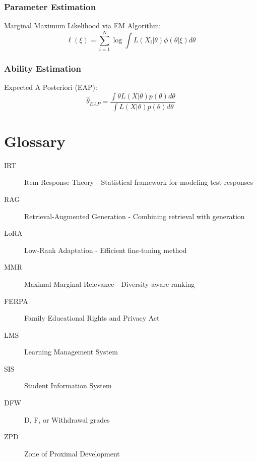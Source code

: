 \documentclass[11pt,a4paper]{report}
\begin{document}
\subsection{Parameter Estimation}
Marginal Maximum Likelihood via EM Algorithm:
\begin{equation}
\ell(\xi) = \sum_{i=1}^N \log \int L(X_i|\theta)\phi(\theta|\xi)d\theta
\end{equation}

\subsection{Ability Estimation}
Expected A Posteriori (EAP):
\begin{equation}
\hat{\theta}_{EAP} = \frac{\int \theta L(X|\theta)p(\theta)d\theta}{\int L(X|\theta)p(\theta)d\theta}
\end{equation}

\chapter{Glossary}

\begin{description}
    \item[IRT] Item Response Theory - Statistical framework for modeling test responses
    \item[RAG] Retrieval-Augmented Generation - Combining retrieval with generation
    \item[LoRA] Low-Rank Adaptation - Efficient fine-tuning method
    \item[MMR] Maximal Marginal Relevance - Diversity-aware ranking
    \item[FERPA] Family Educational Rights and Privacy Act
    \item[LMS] Learning Management System
    \item[SIS] Student Information System
    \item[DFW] D, F, or Withdrawal grades
    \item[ZPD] Zone of Proximal Development
\end{description}
\end{document}
